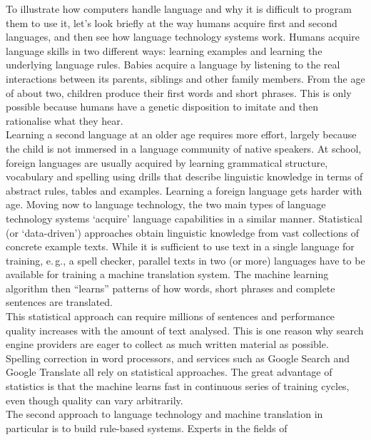 \begin{multicols}{2}
To illustrate how computers handle language and why it is difficult to program
them to use it, let’s look briefly at the way humans acquire first and second
languages, and then see how language technology systems work.
Humans acquire language skills in two different ways: learning
examples and learning the underlying language rules. Babies acquire a
language by listening to the real interactions between its parents,
siblings and other family members. From the age of about two, children
produce their first words and short phrases. This is only possible
because humans have a genetic disposition to imitate and then
rationalise what they hear.\\
Learning a second language at an older age requires more effort, largely
because the child is not immersed in a language community of native speakers.
At school, foreign languages are usually acquired by learning grammatical
structure, vocabulary and spelling using drills that describe linguistic
knowledge in terms of abstract rules, tables and examples. Learning a foreign
language gets harder with age.
Moving now to language technology, the two main types of language technology systems ‘acquire’ language
capabilities in a similar manner. Statistical (or ‘data-driven’) approaches
obtain linguistic knowledge from vast collections of concrete example texts.
While it is sufficient to use text in a single language for training, e.\,g., a
spell checker, parallel texts in two (or more) languages have to be available
for training a machine translation system. The machine learning algorithm then
“learns” patterns of how words, short phrases and complete sentences are
translated.\\
This statistical approach can require millions of sentences and performance
quality increases with the amount of text analysed. This is one reason why
search engine providers are eager to collect as much written material as
possible. Spelling correction in word processors, and services such as Google
Search and Google Translate all rely on statistical approaches. The great
advantage of statistics is that the machine learns fast in continuous series of
training cycles, even though quality can vary arbitrarily.\\
The second approach to language technology and machine translation in
particular is to build rule-based systems. Experts in the fields of

\end{multicols}
